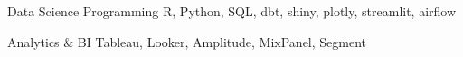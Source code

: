 

\begin{cvskills}

  \cvskill
    {Data Science Programming} %
    {R, Python, SQL, dbt, shiny, plotly, streamlit, airflow} %

\cvskill
{Analytics \& BI} %
{Tableau, Looker, Amplitude, MixPanel, Segment} %



\end{cvskills}
